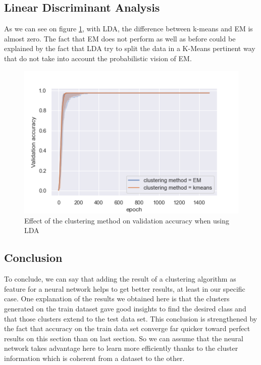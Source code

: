 \documentclass[twocolumn, 10pt]{article}
\begin{document}
		\subsection{Linear Discriminant Analysis}
			As we can see on figure \ref{fig:clusper_lda_cm}, with LDA, the difference between k-means and EM is almost zero. The fact that EM does not perform as well as before could be explained by the fact that LDA try to split the data in a K-Means pertinent way that do not take into account the probabilistic vision of EM.

			\begin{figure}[h]
				\centering
				\includegraphics[width=0.7\linewidth]{../graphics/clusper_LDA_epoch_val_categorical_accuracy_clustering_method.png}
				\caption{Effect of the clustering method on validation accuracy when using LDA}
				\label{fig:clusper_lda_cm}
			\end{figure}
		\subsection{Conclusion}
			To conclude, we can say that adding the result of a clustering algorithm as feature for a neural network helps to get better results, at least in our specific case. One explanation of the results we obtained here is that the clusters generated on the train dataset gave good insights to find the desired class and that those clusters extend to the test data set. This conclusion is strengthened by the fact that accuracy on the train data set converge far quicker toward perfect results on this section than on last section. So we can assume that the neural network takes advantage here to learn more efficiently thanks to the cluster information which is coherent from a dataset to the other.
\end{document}
